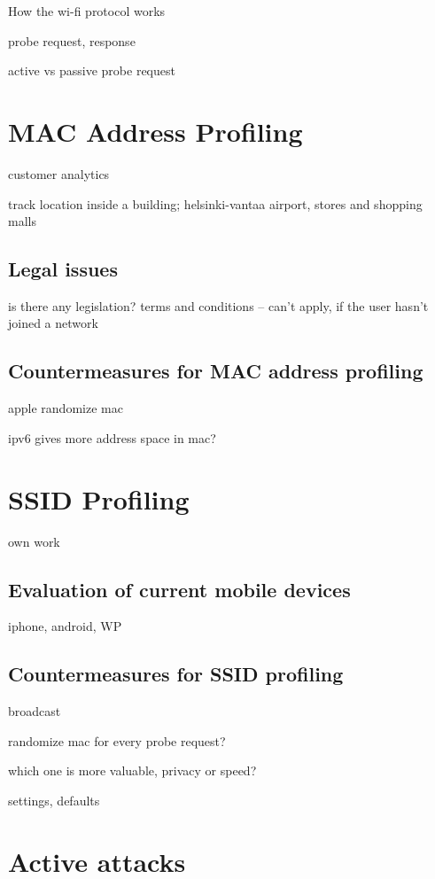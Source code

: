 \documentclass[12pt,a4paper,oneside,pdftex]{report}
\begin{document}

How the wi-fi protocol works

probe request, response

active vs passive probe request

\chapter{MAC Address Profiling}
\label{chapter:mac}

customer analytics

track location inside a building; helsinki-vantaa airport, stores and shopping malls

\section{Legal issues}
is there any legislation? terms and conditions -- can't apply, if the user hasn't joined a network

\section{Countermeasures for MAC address profiling}
\label{sec:countermeasures_mac}
apple randomize mac

ipv6 gives more address space in mac?

\chapter{SSID Profiling}
\label{chapter:ssid}

own work

\section{Evaluation of current mobile devices}
\label{sec:evaluation}
iphone, android, WP


\section{Countermeasures for SSID profiling}
\label{sec:countermeasures_ssid}
broadcast

randomize mac for every probe request?

which one is more valuable, privacy or speed?

settings, defaults

\chapter{Active attacks}
\label{chapter:attacks}
\end{document}
